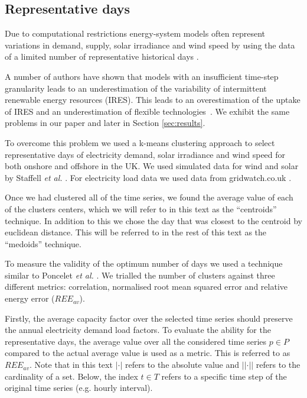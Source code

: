 \documentclass[final,3p,times,twocolumn,numbers]{elsarticle}
\begin{document}
 
\subsection{Representative days}

Due to computational restrictions energy-system models often represent variations in demand, supply, solar irradiance and wind speed by using the data of a limited number of representative historical days \cite{Poncelet2017}.

A number of authors have shown that models with an insufficient time-step granularity leads to an underestimation of the variability of intermittent renewable energy resources (IRES). This leads to an overestimation of the uptake of IRES and an underestimation of flexible technologies~\cite{Ludig2011,Haydt2011}. We exhibit the same problems in our paper \cite{Kell} and later in Section \ref{sec:results}.

To overcome this problem we used a k-means clustering approach to select representative days of electricity demand, solar irradiance and wind speed for both onshore and offshore in the UK. We used simulated data for wind and solar by Staffell \textit{et al.} \cite{Staffell2016}. For electricity load data we used data from gridwatch.co.uk \cite{gridwatch}.

Once we had clustered all of the time series, we found the average value of each of the clusters centers, which we will refer to in this text as the ``centroids'' technique. In addition to this we chose the day that was closest to the centroid by euclidean distance. This will be referred to in the rest of this text as the ``medoids'' technique.

To measure the validity of the optimum number of days we used a technique similar to Poncelet \textit{et al.} \cite{Dhaeseleer2015, Poncelet2017}. We trialled the number of clusters against three different metrics: correlation, normalised root mean squared error and relative energy error ($REE_{av}$). 



Firstly, the average capacity factor over the selected time series should preserve the annual electricity demand load factors. To evaluate the ability for the representative days, the average value over all the considered time series $p\in P$ compared to the actual average value is used as a metric. This is referred to as $REE_{av}$. Note that in this text $\left|\cdot\right|$ refers to the absolute value and $\left|\left|\cdot\right|\right|$ refers to the cardinality of a set. Below, the index $t\in T$ refers to a specific time step of the original time series (e.g. hourly interval).
\end{document}
